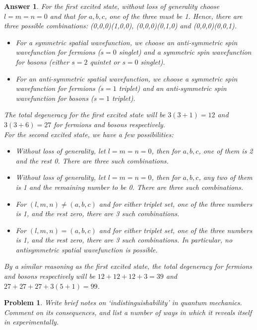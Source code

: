 \documentclass[a4paper]{article}
\newtheorem{ans}{Answer}[section]
\theoremstyle{new}
\newtheorem{qns}{Problem}[section]
\begin{document}
\begin{ans}
For the first excited state, without loss of generality choose $l=m=n=0$ and that for $a,b,c$, one of the three must be 1. Hence, there are three possible combinations: (0,0,0)(1,0,0), (0,0,0)(0,1,0) and (0,0,0)(0,0,1). 
\begin{itemize}
\item For a symmetric spatial wavefunction, we choose an anti-symmetric spin wavefunction for fermions ($s=0$ singlet) and a symmetric spin wavefunction for bosons (either $s=2$ quintet or $s=0$ singlet). 
\item For an anti-symmetric spatial wavefunction, we choose a symmetric spin wavefunction for fermions ($s=1$ triplet) and an anti-symmetric spin wavefunction for bosons ($s=1$ triplet). 
\end{itemize}
The total degeneracy for the first excited state will be $3(3+1)=12$ and $3(3+6)=27$ for fermions and bosons respectively.\\[5pt]
For the second excited state, we have a few possibilities:
\begin{itemize}
    \item Without loss of generality, let $l=m=n=0$, then for $a,b,c$, one of them is 2 and the rest 0. There are three such combinations.
    \item Without loss of generality, let $l=m=n=0$, then for $a,b,c$, any two of them is 1 and the remaining number to be 0. There are three such combinations.
    \item For $(l,m,n)\neq(a,b,c)$ and for either triplet set, one of the three numbers is 1, and the rest zero, there are 3 such combinations.
    \item For $(l,m,n)=(a,b,c)$ and for either triplet set, one of the three numbers is 1, and the rest zero, there are 3 such combinations. In particular, no antisymmetric spatial wavefunction is possible.
\end{itemize}
By a similar reasoning as the first excited state, the total degeneracy for fermions and bosons respectively will be $12+12+12+3=39$ and $27+27+27+3(5+1)=99$.
\end{ans}
\newpage
\begin{qns}
Write brief notes on `indistinguishability' in quantum mechanics. Comment on its consequences, and list a number of ways in which it reveals itself in experimentally.
\end{qns}
\end{document}
